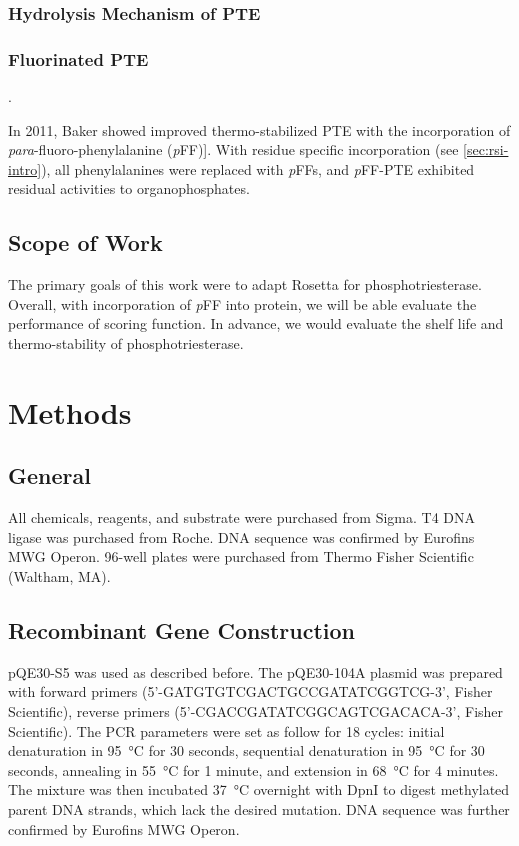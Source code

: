 \begin{refsection}
\subsubsection{Hydrolysis Mechanism of PTE}

\subsubsection{Fluorinated PTE}.

In 2011, Baker  showed improved thermo-stabilized PTE with the
incorporation of \emph{para}-fluoro-phenylalanine
(\emph{p}FF)]\cite{Baker2011b}. With residue specific incorporation (see
\ref{sec:rsi-intro}), all phenylalanines were replaced with \emph{p}FFs, and
\emph{p}FF-PTE exhibited residual activities to organophosphates.

\subsection{Scope of Work}

The primary goals of this work were to adapt Rosetta for phosphotriesterase.
Overall, with incorporation of \emph{p}FF into protein, we will be able
evaluate the performance of scoring function. In advance, we would evaluate the
shelf life and thermo-stability of phosphotriesterase.

\section{Methods}

\subsection{General}

All chemicals, reagents, and substrate were purchased from Sigma. T4 DNA ligase
was purchased from Roche. DNA sequence was confirmed by Eurofins MWG Operon.
96-well plates were purchased from Thermo Fisher Scientific (Waltham, MA).

\subsection{Recombinant Gene Construction}

pQE30-S5 was used as described before\cite{Baker2011b}. The pQE30-104A plasmid
was prepared with forward primers (5’-GATGTGTCGACTGCCGATATCGGTCG-3’, Fisher
Scientific), reverse primers (5’-CGACCGATATCGGCAGTCGACACA-3’, Fisher
Scientific). The PCR parameters were set as follow for 18 cycles: initial
denaturation in \SI{95}{\celsius} for 30 seconds, sequential denaturation in
\SI{95}{\celsius} for 30 seconds, annealing in \SI{55}{\celsius} for 1 minute,
and extension in \SI{68}{\celsius} for 4 minutes. The mixture was then
incubated \SI{37}{\celsius} overnight with DpnI to digest methylated parent DNA
strands, which lack the desired mutation. DNA sequence was further confirmed by
Eurofins MWG Operon.


\end{refsection}
